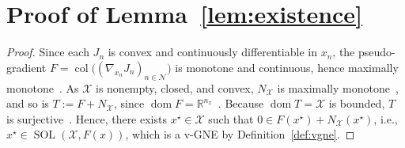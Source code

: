 \documentclass[final]{l4dc2026}
\begin{document}
\section{Proof of Lemma~\ref{lem:existence} }
\label{app:proofLemma}
\begin{proof}
Since each $J_n$ is convex and continuously differentiable in $x_n$, the pseudo-gradient $F=\operatorname{col}\big((\nabla_{x_n}J_n)_{n\in\mathcal N}\big)$ is monotone and continuous, hence maximally monotone~\citep[Cor.~20.28]{bauschke2017convex}. As $\mathcal X$ is nonempty, closed, and convex, $N_{\mathcal X}$ is maximally monotone~\citep[Ex.~20.26]{bauschke2017convex}, and so is $T:=F+N_{\mathcal X}$, since $\operatorname{dom}F=\mathbb R^{n_x}$~\citep[Cor.~25.5(i)]{bauschke2017convex}. Because $\operatorname{dom}T=\mathcal X$ is bounded, $T$ is surjective~\citep[Cor.~21.25]{bauschke2017convex}. Hence, there exists $x^\star\in\mathcal X$ such that $0\in F(x^\star)+N_{\mathcal X}(x^\star)$, i.e., $x^\star\in\operatorname{SOL}(\mathcal X,F(x))$, which is a v-GNE by Definition~\ref{def:vgne}.
\end{proof}
\end{document}
